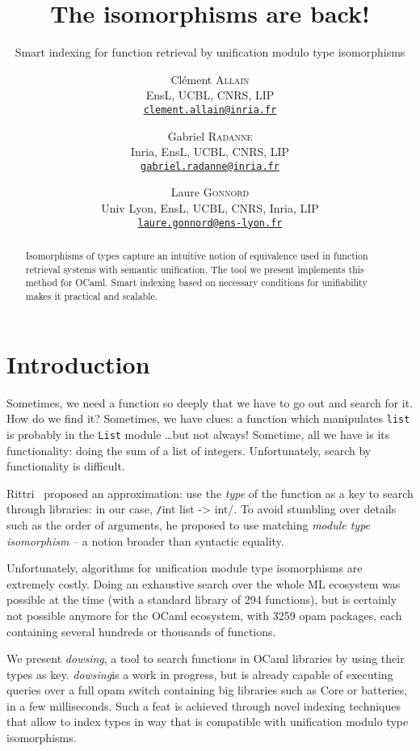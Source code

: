 \documentclass [a4paper,11pt] {scrartcl}
\title {The isomorphisms are back!}
\subtitle {Smart indexing for function retrieval by unification modulo type isomorphisms}
\author {
    Clément \textsc {Allain} \\
    EnsL, UCBL, CNRS, LIP \\
    \href {mailto:clement.allain@inria.fr}
    {\nolinkurl {clement.allain@inria.fr}}
  \and
  \and
    Gabriel \textsc {Radanne} \\
    Inria, EnsL, UCBL, CNRS, LIP \\
    \href {mailto:gabriel.radanne@inria.fr}
    {\nolinkurl {gabriel.radanne@inria.fr}}
  \and
    Laure \textsc {Gonnord} \\
    Univ Lyon, EnsL, UCBL, CNRS, Inria, LIP \\
    \href {mailto:laure.gonnord@ens-lyon.fr}
    {\nolinkurl {laure.gonnord@ens-lyon.fr}}
}
\date {}
\newcommand {\dowsing} {\textit {dowsing}}
\begin{document}
\maketitle


\begin {abstract}
  Isomorphisms of types capture an intuitive notion of equivalence used in function retrieval systems with semantic unification. The tool we present implements this method for OCaml. Smart indexing based on necessary conditions for unifiability makes it practical and scalable.
\end {abstract}


\section {Introduction}

Sometimes, we need a function so deeply that we have to go out and search for it.
How do we find it? Sometimes, we have clues: a function which manipulates \texttt{list} is probably
in the \texttt{List} module \dots but not always!
Sometime, all we have is its functionality: doing the sum of a list of integers.
Unfortunately, search by functionality is difficult.

Rittri~\cite{rittri} proposed an approximation: use the \emph{type} of the function as a key
to search through libraries: in our case, \texttt/int list -> int/.
To avoid stumbling over details such
as the order of arguments, he proposed to use matching \emph{module type isomorphism} --
a notion broader than syntactic equality.

Unfortunately, algorithms for unification module type isomorphisms are extremely
costly. Doing an exhaustive search over the whole ML ecosystem
was possible at the time (with a standard library of 294 functions),
but is certainly not possible anymore for the OCaml ecosystem,
with 3259 opam packages, each containing several hundreds or thousands of
functions.

We present \dowsing, a tool to search functions in OCaml libraries by
using their types as key.
\dowsing is a work in progress, but is already capable of
executing queries over a full opam switch
containing big libraries such as Core or batteries, in a few milliseconds.
Such a feat is achieved through novel indexing techniques that allow
to index types in way that is compatible with unification modulo type
isomorphisms.
\end{document}
